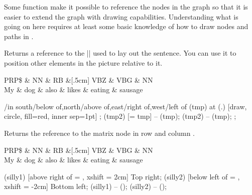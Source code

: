 \documentclass[a4paper]{ltxdoc}
\begin{document}
Some function make it possible to reference the nodes in the graph so that it is easier to extend the graph with \tikzname{} drawing capabilities. Understanding what is going on here requires at least some basic knowledge of how to draw nodes and paths in \tikzname{}.

\begin{command}{\matrixref}
   Returns a reference to the |\matrix| used to lay out the sentence. You can use it to position other elements in the picture relative to it.
\begin{codeexample}[]
\begin{dependency}
   \begin{deptext}[column sep=.5cm, row sep=.1ex]
      PRP\$ \& NN \& RB \&[.5cm] VBZ \& VBG \& NN \\
      My \& dog \& also \& likes \& eating \& sausage \\
   \end{deptext}
   \foreach \a/\pos in {south/below of,north/above of,east/right of,west/left of} {
      \node (tmp) at (\matrixref.\a) [draw, circle, fill=red, inner sep=1pt] {};
      \node (tmp2) [\pos = tmp] {\a} -- (tmp);
      \draw [->] (tmp2) -- (tmp);
   };
\end{dependency}
\end{codeexample}

\end{command}

\begin{command}{\wordref{}}

   Returns the reference to the matrix node in row  and column .

\begin{codeexample}[]
\begin{dependency}
   \begin{deptext}[column sep=.5cm, row sep=.1ex]
      PRP\$ \& NN \& RB \&[.5cm] VBZ \& VBG \& NN \\
      My \& dog \& also \& likes \& eating \& sausage \\
   \end{deptext}
   \node (silly1) [above right of = , xshift = 2cm] {Top right};
   \node (silly2) [below left of = , xshift = -2cm] {Bottom left};
    (silly1) -- ();
    (silly2) -- ();
\end{dependency}
\end{codeexample}
\end{command}
\end{document}
